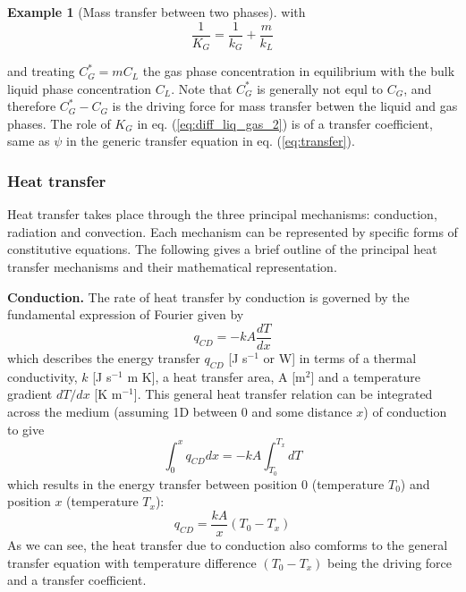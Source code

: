 \documentclass[a4paper,11pt]{article}
\theoremstyle{definition}
\newtheorem{exmp}{Example}[section]
\begin{document}
\begin{exmp}[Mass transfer between two phases]
\noindent with
\begin{equation} 
	\frac{1}{K_G} = \frac{1}{k_G} + \frac{m}{k_L}
\end{equation}

\noindent and treating $C_G^* = m C_L$ the gas phase concentration in equilibrium with the bulk liquid phase concentration
$C_L$. Note that $C_G^*$ is generally not equl to $C_G$, and therefore $C_G^* - C_G$ is the driving force
for mass transfer betwen the liquid and gas phases. The role of $K_G$ in eq. (\ref{eq:diff_liq_gas_2}) is
of a transfer coefficient, same as $\psi$ in the generic transfer equation in eq. (\ref{eq:transfer}).

\end{exmp}

\subsubsection*{Heat transfer}

Heat transfer takes place through the three principal mechanisms: conduction, radiation and convection. 
Each mechanism can be represented by specific forms of constitutive equations. 
The following gives a brief outline of the principal heat transfer mechanisms and their mathematical representation.

\textbf{Conduction.} The rate of heat transfer by conduction is governed by the fundamental expression of
Fourier given by
\begin{equation}
	q_{CD} = -k A \frac{d T}{d x}
\end{equation}
\noindent which describes the energy transfer $q_{CD}$ [J s$^{-1}$ or W] in terms of a thermal conductivity, 
$k$ [J s$^{-1}$ m K], a heat transfer area, A [m$^2$] and a temperature gradient $dT/dx$
[K m$^{-1}$]. This general heat transfer relation can be integrated across the medium (assuming 1D between 0 and some distance $x$)
of conduction to give
\begin{equation}
	\int_0^x q_{CD} dx = -k A \int_{T_0}^{T_x} d T
\end{equation}
\noindent which results in the energy transfer between position 0 (temperature $T_0$) 
and position $x$ (temperature $T_x$):
\begin{equation}
	q_{CD} = \frac{k A}{x} (T_0 - T_x)
\end{equation}
As we can see, the heat transfer due to conduction also comforms to the general transfer equation with
temperature difference $(T_0 - T_x)$ being the driving force and a transfer coefficient.
\end{document}

